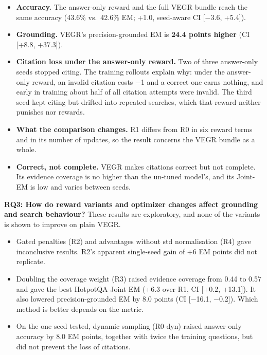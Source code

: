 \begin{itemize}
\tightlist
\item
  \textbf{Accuracy.} The answer-only reward and the full VEGR bundle
  reach the same accuracy (43.6\% vs.~42.6\% EM; +1.0, seed-aware CI
  {[}−3.6, +5.4{]}).
\item
  \textbf{Grounding.} VEGR's precision-grounded EM is \textbf{24.4
  points higher} (CI {[}+8.8, +37.3{]}).
\item
  \textbf{Citation loss under the answer-only reward.} Two of three
  answer-only seeds stopped citing. The training rollouts explain why:
  under the answer-only reward, an invalid citation costs −1 and a
  correct one earns nothing, and early in training about half of all
  citation attempts were invalid. The third seed kept citing but drifted
  into repeated searches, which that reward neither punishes nor
  rewards.
\item
  \textbf{What the comparison changes.} R1 differs from R0 in six reward
  terms and in its number of updates, so the result concerns the VEGR
  bundle as a whole.
\item
  \textbf{Correct, not complete.} VEGR makes citations correct but not
  complete. Its evidence coverage is no higher than the un-tuned
  model's, and its Joint-EM is low and varies between seeds.
\end{itemize}

\textbf{RQ3: How do reward variants and optimizer changes affect
grounding and search behaviour?} These results are exploratory, and none
of the variants is shown to improve on plain VEGR.

\begin{itemize}
\tightlist
\item
  Gated penalties (R2) and advantages without std normalisation (R4)
  gave inconclusive results. R2's apparent single-seed gain of +6 EM
  points did not replicate.
\item
  Doubling the coverage weight (R3) raised evidence coverage from 0.44
  to 0.57 and gave the best HotpotQA Joint-EM (+6.3 over R1, CI {[}+0.2,
  +13.1{]}). It also lowered precision-grounded EM by 8.0 points (CI
  {[}−16.1, −0.2{]}). Which method is better depends on the metric.
\item
  On the one seed tested, dynamic sampling (R0-dyn) raised answer-only
  accuracy by 8.0 EM points, together with twice the training questions,
  but did not prevent the loss of citations.
\end{itemize}

